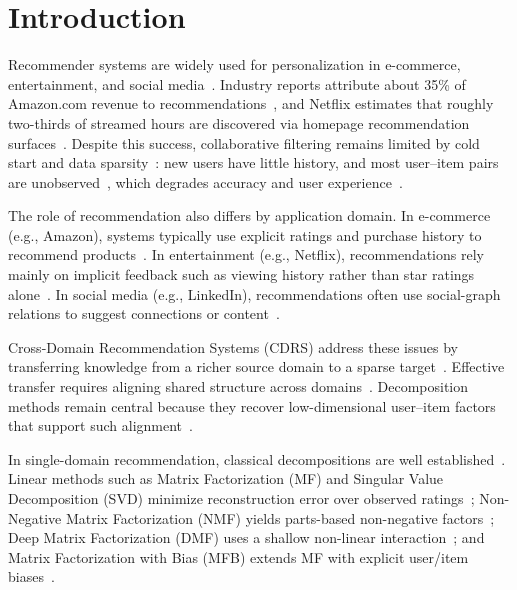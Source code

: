 \documentclass[pdflatex,sn-mathphys-num]{sn-jnl}%
\theoremstyle{thmstyleone}%
\theoremstyle{thmstyletwo}%
\theoremstyle{thmstylethree}%
\begin{document}
\section{Introduction}\label{sec1}

Recommender systems are widely used for personalization in e-commerce, entertainment, and social media~\cite{schafer1999recommender, lu2015recommender, resnick1997recommender}. Industry reports attribute about 35\% of Amazon.com revenue to recommendations~\cite{mackenzie2013retailers}, and Netflix estimates that roughly two-thirds of streamed hours are discovered via homepage recommendation surfaces~\cite{gomez2015netflix}. Despite this success, collaborative filtering remains limited by cold start and data sparsity~\cite{adomavicius2005toward, isinkaye2015recommendation, su2009survey}: new users have little history, and most user--item pairs are unobserved~\cite{zharova2024application}, which degrades accuracy and user experience~\cite{chen2015recommender, he2016interactive, zharova2023neural}.

The role of recommendation also differs by application domain. In e-commerce (e.g., Amazon), systems typically use explicit ratings and purchase history to recommend products~\cite{schafer1999recommender}. In entertainment (e.g., Netflix), recommendations rely mainly on implicit feedback such as viewing history rather than star ratings alone~\cite{gomez2015netflix}. In social media (e.g., LinkedIn), recommendations often use social-graph relations to suggest connections or content~\cite{lu2015recommender, ko2022survey}.

Cross-Domain Recommendation Systems (CDRS) address these issues by transferring knowledge from a richer source domain to a sparse target~\cite{zang2022survey, ayemowa2024systematic, koren2021advances, weiss2016survey, patel2025enhanced, li2022adversarial}. Effective transfer requires aligning shared structure across domains~\cite{ko2022survey}. Decomposition methods remain central because they recover low-dimensional user--item factors that support such alignment~\cite{koren2009matrix}.

In single-domain recommendation, classical decompositions are well established~\cite{ayemowa2024systematic, koren2009matrix, mnih2007probabilistic}. Linear methods such as Matrix Factorization (MF) and Singular Value Decomposition (SVD) minimize reconstruction error over observed ratings~\cite{sarwar2002incremental}; Non-Negative Matrix Factorization (NMF) yields parts-based non-negative factors~\cite{lee2000algorithms}; Deep Matrix Factorization (DMF) uses a shallow non-linear interaction~\cite{xue2017deep,he2017neural}; and Matrix Factorization with Bias (MFB) extends MF with explicit user/item biases~\cite{koren2009matrix,koren2021advances}.
\end{document}
